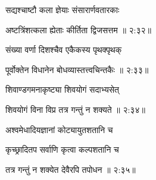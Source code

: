 {\devanagarifont सद्यश्चाष्टौ कला ज्ञेयाः संसारार्णवतारकाः \thinspace{\dandab} \dontdisplaylinenum }%


{\devanagarifont अष्टत्रिंशत्कला ह्येताः कीर्तिता द्विजसत्तम {॥ २:३२॥} \veg\dontdisplaylinenum }%

{\devanagarifont संख्या वर्णा दिशश्चैव एकैकस्य पृथक्पृथक् \thinspace{\dandab} \dontdisplaylinenum }%


{\devanagarifont पूर्वोक्तेन विधानेन बोधव्यास्तत्त्वचिन्तकैः {॥ २:३३॥} \veg\dontdisplaylinenum }%

{\devanagarifont शिवाण्डगमनाकृष्ट्या शिवयोगं सदाभ्यसेत् \thinspace{\dandab} \dontdisplaylinenum }%


{\devanagarifont शिवयोगं विना विप्र तत्र गन्तुं न शक्यते {॥ २:३४॥} \veg\dontdisplaylinenum }%

{\devanagarifont अश्वमेधादियज्ञानां कोट्यायुतशतानि च \thinspace{\dandab} \dontdisplaylinenum }%
 
{\devanagarifont कृच्छ्रादितप सर्वाणि कृत्वा कल्पशतानि च  \danda\dontdisplaylinenum }%


{\devanagarifont तत्र गन्तुं न शक्येत देवैरपि तपोधन {॥ २:३५॥} \veg\dontdisplaylinenum }%

